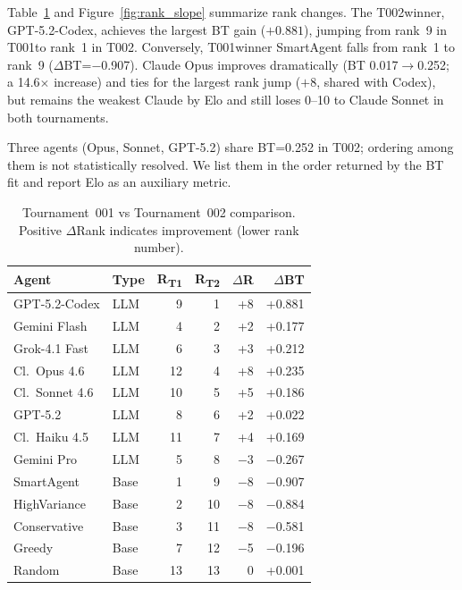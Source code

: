 \documentclass[11pt]{article}
\newcommand{\tOne}{T001}
\newcommand{\tTwo}{T002}
\begin{document}
Table~\ref{tab:t1_t2_comp} and Figure~\ref{fig:rank_slope} summarize rank changes.
The \tTwo winner, GPT-5.2-Codex, achieves the largest BT gain ($+0.881$), jumping from rank~9 in \tOne to rank~1 in \tTwo.
Conversely, \tOne winner SmartAgent falls from rank~1 to rank~9 ($\Delta$BT=$-$0.907).
Claude Opus improves dramatically (BT 0.017$\to$0.252; a 14.6$\times$ increase) and ties for the largest rank jump ($+$8, shared with Codex), but remains the weakest Claude by Elo and still loses 0--10 to Claude Sonnet in both tournaments.

Three agents (Opus, Sonnet, GPT-5.2) share BT=0.252 in \tTwo; ordering among them is not statistically resolved.
We list them in the order returned by the BT fit and report Elo as an auxiliary metric.

\begin{table}[t]
\centering
\small
\caption{Tournament~001 vs Tournament~002 comparison. Positive $\Delta$Rank indicates improvement (lower rank number).}
\label{tab:t1_t2_comp}
\begin{tabular}{llrrrr}
\toprule
Agent & Type & R\textsubscript{T1} & R\textsubscript{T2} & $\Delta$R & $\Delta$BT \\
\midrule
GPT-5.2-Codex & LLM & 9 & 1 & +8 & +0.881 \\
Gemini Flash & LLM & 4 & 2 & +2 & +0.177 \\
Grok-4.1 Fast & LLM & 6 & 3 & +3 & +0.212 \\
Cl.\ Opus 4.6 & LLM & 12 & 4 & +8 & +0.235 \\
Cl.\ Sonnet 4.6 & LLM & 10 & 5 & +5 & +0.186 \\
GPT-5.2 & LLM & 8 & 6 & +2 & +0.022 \\
Cl.\ Haiku 4.5 & LLM & 11 & 7 & +4 & +0.169 \\
Gemini Pro & LLM & 5 & 8 & $-$3 & $-$0.267 \\
SmartAgent & Base & 1 & 9 & $-$8 & $-$0.907 \\
HighVariance & Base & 2 & 10 & $-$8 & $-$0.884 \\
Conservative & Base & 3 & 11 & $-$8 & $-$0.581 \\
Greedy & Base & 7 & 12 & $-$5 & $-$0.196 \\
Random & Base & 13 & 13 & 0 & +0.001 \\
\bottomrule
\end{tabular}
\end{table}
\end{document}

